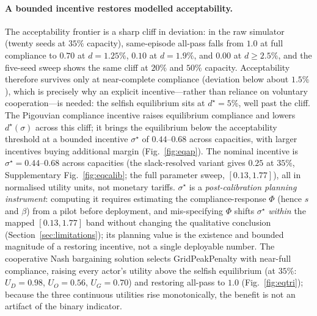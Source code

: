 \documentclass[12pt]{article}
\newcommand{\figref}[1]{Fig.~\ref{#1}}
\begin{document}
\paragraph{A bounded incentive restores modelled acceptability.} The acceptability frontier is a
sharp cliff in deviation: in the raw simulator (twenty seeds at $35\%$ capacity),
same-episode all-pass falls from $1.0$ at full compliance to $0.70$ at $d=1.25\%$, $0.10$
at $d=1.9\%$, and $0.00$ at $d\ge2.5\%$, and the five-seed sweep shows the same cliff at
$20\%$ and $50\%$ capacity. Acceptability therefore survives only at near-complete
compliance (deviation below about $1.5\%$), which is
precisely why an explicit incentive---rather than reliance on voluntary cooperation---is
needed: the selfish equilibrium sits at $d^\star=5\%$, well past the cliff. The Pigouvian
compliance incentive raises equilibrium compliance and lowers $d^\star(\sigma)$ across
this cliff; it brings the equilibrium below the acceptability threshold at a bounded
incentive $\sigma^\star$ of $0.44$--$0.68$ across capacities, with larger incentives
buying additional margin (\figref{fig:eqap}). The nominal incentive is $\sigma^\star=0.44$--$0.68$ across capacities (the slack-resolved variant gives $0.25$ at $35\%$, Supplementary Fig.~\ref{fig:eqcalib}; the full parameter sweep, $[0.13,1.77]$), all in normalised utility units, not monetary tariffs. $\sigma^\star$ is a \emph{post-calibration planning instrument}: computing it requires estimating the compliance-response $\Phi$ (hence $s$ and $\beta$) from a pilot before deployment, and mis-specifying $\Phi$ shifts $\sigma^\star$ \emph{within} the mapped $[0.13,1.77]$ band without changing the qualitative conclusion (Section~\ref{sec:limitations}); its planning value is the existence and bounded magnitude of a restoring incentive, not a single deployable number. The cooperative Nash bargaining solution selects GridPeakPenalty with near-full compliance, raising every actor's utility above the selfish equilibrium (at $35\%$: $U_D=0.98$, $U_O=0.56$, $U_G=0.70$) and restoring all-pass to $1.0$ (\figref{fig:eqtri}); because the three continuous utilities rise monotonically, the benefit is not an artifact of the binary indicator.
\end{document}
